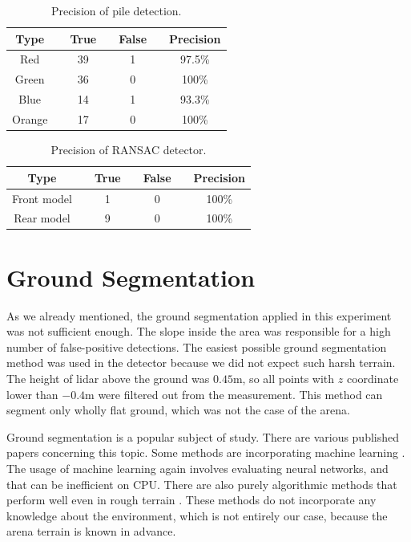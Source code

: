 \begin{table}[H]
	\centering
	\caption{Precision of pile detection.}
	\begin{tabular}{ccccccc}
		\toprule
		Type &\quad& True &\quad& False &\quad& Precision \\
		\midrule
		Red &\quad& 39 &\quad& 1 &\quad& 97.5\% \\
		Green &\quad& 36 &\quad& 0 &\quad& 100\% \\
		Blue &\quad& 14 &\quad& 1 &\quad& 93.3\% \\
		Orange &\quad& 17 &\quad& 0 &\quad& 100\% \\
		\bottomrule
	\end{tabular}
	\label{tab:pile_precision}
\end{table}


\begin{table}[H]
	\centering
	\caption{Precision of RANSAC detector.}
	\begin{tabular}{ccccccc}
		\toprule
		Type &\quad& True &\quad& False &\quad& Precision \\
		\midrule
		Front model &\quad& 1 &\quad& 0 &\quad& 100\% \\
		Rear model &\quad& 9 &\quad& 0 &\quad& 100\% \\
		\bottomrule
	\end{tabular}
	\label{tab:RANSAC_precision}
\end{table}


\section{Ground Segmentation}
As we already mentioned, the ground segmentation applied in this experiment was not sufficient enough. The slope inside the area was responsible for a high number of false-positive detections. The easiest possible ground segmentation method was used in the detector because we did not expect such harsh terrain. The height of lidar above the ground was $0.45$m, so all points with $z$ coordinate lower than $-0.4$m were filtered out from the measurement. This method can segment only wholly flat ground, which was not the case of the arena.

Ground segmentation is a popular subject of study. There are various published papers concerning this topic. Some methods are incorporating machine learning \cite{velas2018}. The usage of machine learning again involves evaluating neural networks, and that can be inefficient on CPU. There are also purely algorithmic methods that perform well even in rough terrain \cite{phuong2019}. These methods do not incorporate any knowledge about the environment, which is not entirely our case, because the arena terrain is known in advance.

